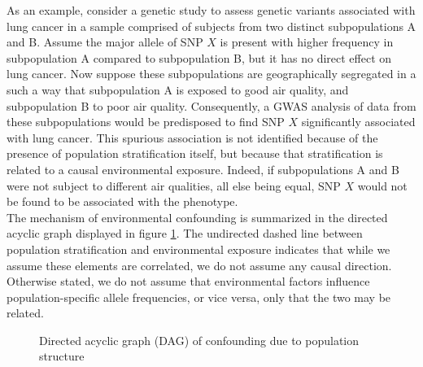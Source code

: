 As an example, consider a genetic study to assess genetic variants associated with lung cancer in a sample comprised of subjects from two distinct subpopulations A and B. Assume the major allele of SNP $X$ is present with higher frequency in subpopulation A compared to subpopulation B, but it has no direct effect on lung cancer. Now suppose these subpopulations are geographically segregated in a such a way that subpopulation A is exposed to good air quality, and subpopulation B to poor air quality. Consequently, a GWAS analysis of data from these subpopulations would be predisposed to find SNP $X$ significantly associated with lung cancer. This spurious association is not identified because of the presence of population stratification itself, but because that stratification is related to a causal environmental exposure. Indeed, if subpopulations A and B were not subject to different air qualities, all else being equal, SNP $X$ would not be found to be associated with the phenotype.\\


The mechanism of environmental confounding is summarized in the directed acyclic graph displayed in figure \ref{fig:ps_env}. The undirected dashed line between population stratification and environmental exposure indicates that while we assume these elements are correlated, we do not assume any causal direction. Otherwise stated, we do not assume that environmental factors  influence population-specific allele frequencies, or vice versa, only that the two may be related.  

\begin{figure}[H]
\centering
{}
\caption{Directed acyclic graph (DAG) of confounding due to population structure}
\label{fig:ps_env}
\end{figure}

